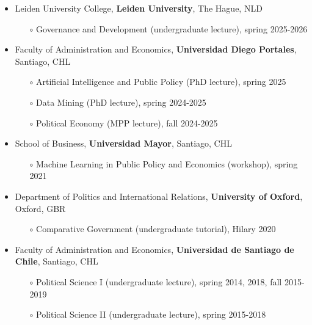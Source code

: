 \begin{publications}

\begin{itemize}
\item{\small Leiden University College, {\bfseries Leiden University}, The Hague, NLD}
\begin{itemize}
\item[$\circ$]{\small Governance and Development (undergraduate lecture), spring 2025-2026}
\end{itemize}
\item{\small Faculty of Administration and Economics, {\bfseries Universidad Diego Portales}, Santiago, CHL}
\begin{itemize}
\item[$\circ$]{\small Artificial Intelligence and Public Policy (PhD lecture), spring 2025}
\item[$\circ$]{\small Data Mining (PhD lecture), spring 2024-2025}
\item[$\circ$]{\small Political Economy (MPP lecture), fall 2024-2025}
\end{itemize}
\item{\small School of Business, {\bfseries Universidad Mayor}, Santiago, CHL}
\begin{itemize}
\item[$\circ$]{\small Machine Learning in Public Policy and Economics (workshop), spring 2021}
\end{itemize}
\item{\small Department of Politics and International Relations, {\bfseries University of Oxford}, Oxford, GBR}
\begin{itemize}
\item[$\circ$]{\small Comparative Government (undergraduate tutorial), Hilary 2020}
\end{itemize}
\item{\small Faculty of Administration and Economics, {\bfseries Universidad de Santiago de Chile}, Santiago, CHL}
\begin{itemize}
\item[$\circ$]{\small Political Science I (undergraduate lecture), spring 2014, 2018, fall 2015-2019}
\item[$\circ$]{\small Political Science II (undergraduate lecture), spring 2015-2018}

\end{itemize}
\end{itemize}
\end{publications}
